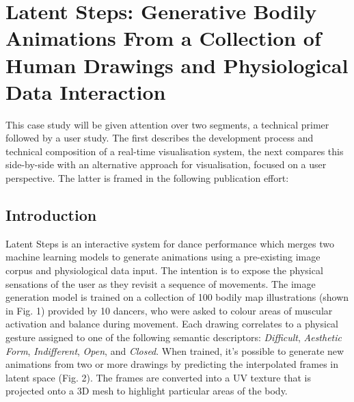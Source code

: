 \section[Latent Steps]{Latent Steps: Generative Bodily Animations From a Collection of Human Drawings and Physiological Data Interaction}

\label{case_studies:latent_steps}

This case study will be given attention over two segments, a technical primer followed by a user study. The first describes the development process and technical composition of a real-time visualisation system, the next compares this side-by-side with an alternative approach for visualisation, focused on a user perspective. The latter is framed in the following publication effort:




\subsection{Introduction}

Latent Steps is an interactive system for dance performance which merges two machine learning models to generate animations using a pre-existing image corpus and physiological data input. The intention is to expose the physical sensations of the user as they revisit a sequence of movements.
The image generation model is trained on a collection of 100 bodily map illustrations (shown in Fig. 1) provided by 10 dancers, who were asked to colour areas of muscular activation and balance during movement. Each drawing correlates to a physical gesture assigned to one of the following semantic descriptors: \textit{Difficult}, \textit{Aesthetic Form}, \textit{Indifferent}, \textit{Open}, and \textit{Closed}. When trained, it’s possible to generate new animations from two or more drawings by predicting the interpolated frames in latent space (Fig. 2). The frames are converted into a UV texture that is projected onto a 3D mesh to highlight particular areas of the body.

